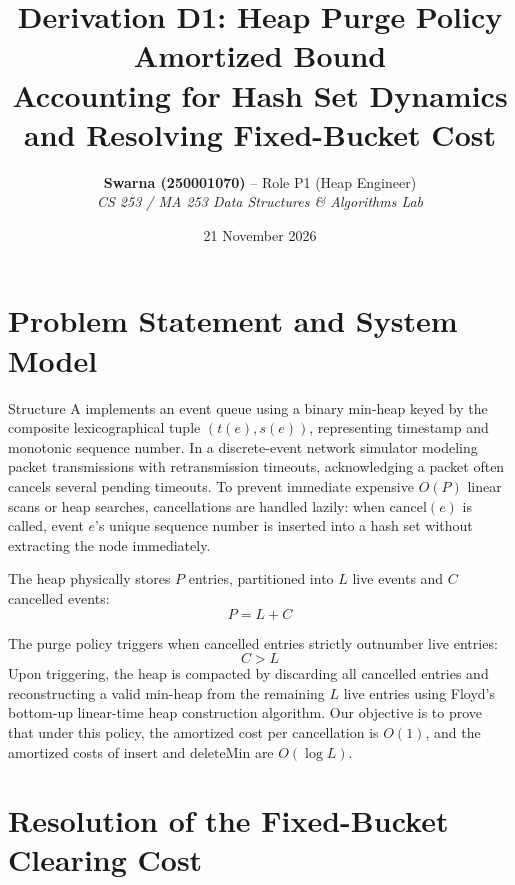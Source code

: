 \documentclass[11pt,a4paper]{article}
\title{\textbf{Derivation D1: Heap Purge Policy Amortized Bound}\\
\large Accounting for Hash Set Dynamics and Resolving Fixed-Bucket Cost}
\author{\textbf{Swarna (250001070)} -- Role P1 (Heap Engineer)\\
\textit{CS 253 / MA 253 Data Structures \& Algorithms Lab}}
\date{21 November 2026}
\begin{document}
\maketitle

\section{Problem Statement and System Model}
Structure A implements an event queue using a binary min-heap keyed by the composite lexicographical tuple $(t(e), s(e))$, representing timestamp and monotonic sequence number. In a discrete-event network simulator modeling packet transmissions with retransmission timeouts, acknowledging a packet often cancels several pending timeouts. To prevent immediate expensive $O(P)$ linear scans or heap searches, cancellations are handled lazily: when $\text{cancel}(e)$ is called, event $e$'s unique sequence number is inserted into a hash set without extracting the node immediately.

The heap physically stores $P$ entries, partitioned into $L$ live events and $C$ cancelled events:
\begin{equation}
P = L + C
\end{equation}

The purge policy triggers when cancelled entries strictly outnumber live entries:
\begin{equation}
C > L
\end{equation}
Upon triggering, the heap is compacted by discarding all cancelled entries and reconstructing a valid min-heap from the remaining $L$ live entries using Floyd's bottom-up linear-time heap construction algorithm. Our objective is to prove that under this policy, the amortized cost per cancellation is $O(1)$, and the amortized costs of $\text{insert}$ and $\text{deleteMin}$ are $O(\log L)$.

\section{Resolution of the Fixed-Bucket Clearing Cost}
\noindent{}
\vspace{0.8em}
\end{document}

